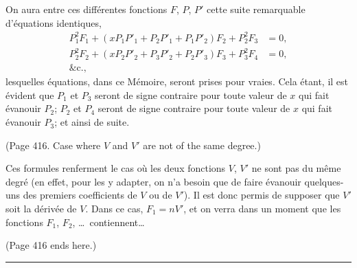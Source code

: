 \documentclass[11pt,a4paper]{article}
\theoremstyle{plain}
\theoremstyle{definition}
\begin{document}
On aura entre ces diff\'{e}rentes fonctions $F$, $P$, $P'$ cette suite remarquable d'\'{e}quations identiques,
\begin{align*}
P_1^2 F_1 + (xP_1P'_1 + P_2P'_1 + P_1P'_2) F_2 + P_2^2 F_3 &= 0, \\
P_2^2 F_2 + (xP_2P'_2 + P_3P'_2 + P_2P'_3) F_3 + P_3^2 F_4 &= 0, \\
\&\text{c.},
\end{align*}
lesquelles \'{e}quations, dans ce M\'{e}moire, seront prises pour vraies. Cela \'{e}tant, il est
\'{e}vident que $P_1$ et $P_3$ seront de signe contraire pour toute valeur de $x$ qui fait \'{e}vanouir
$P_2$; $P_2$ et $P_4$ seront de signe contraire pour toute valeur de $x$ qui fait \'{e}vanouir $P_3$; et
ainsi de suite.

(Page 416. Case where $V$ and $V'$ are not of the same degree.)

Ces formules renferment le cas o\`{u} les deux fonctions $V$, $V'$ ne sont pas du m\^{e}me
degr\'{e} (en effet, pour les y adapter, on n'a besoin que de faire \'{e}vanouir quelques-uns
des premiers coefficients de $V$ ou de $V'$). Il est donc permis de supposer que $V'$ soit
la d\'{e}riv\'{e}e de $V$. Dans ce cas, $F_1 = nV'$, et on verra dans un moment que les fonctions
$F_1$, $F_2$, \ldots\ contiennent\ldots

(Page 416 ends here.)

\bigskip
\hrule
\bigskip
\end{document}
